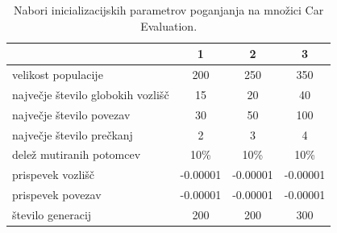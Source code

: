 \begin{table}[H]
    \begin{center}
        \begin{tabular}{||l c c c||}
            \hline
            & 1        & 2        & 3 \\ [0.5ex]
            \hline
            velikost populacije               & 200      & 250      & 350      \\
            \hline
            največje število globokih vozlišč & 15       & 20       & 40       \\
            \hline
            največje število povezav          & 30       & 50       & 100      \\
            \hline
            največje število prečkanj         & 2        & 3        & 4        \\
            \hline
            delež mutiranih potomcev          & 10\%     & 10\%     & 10\%     \\
            \hline
            prispevek vozlišč                 & -0.00001 & -0.00001 & -0.00001 \\
            \hline
            prispevek povezav                 & -0.00001 & -0.00001 & -0.00001 \\
            \hline
            število generacij                 & 200      & 200      & 300      \\
            \hline
        \end{tabular}
    \end{center}
    \caption{Nabori inicializacijskih parametrov poganjanja na množici Car Evaluation.}
    \label{tab:param_car}
\end{table}

